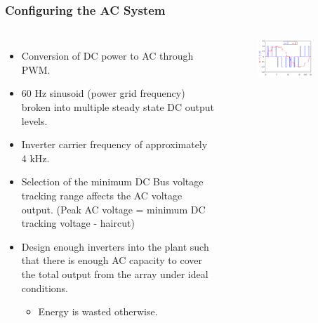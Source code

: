 \documentclass[aspectratio=169]{beamer}
\begin{document}
\begin{frame}
  \frametitle{Configuring the AC System}
  \begin{columns}[t]
    \begin{itemize}
    \item Conversion of DC power to AC through PWM.
    \item 60 Hz sinusoid (power grid frequency) broken into multiple
      steady state DC output levels.
    \item Inverter carrier frequency of approximately 4 kHz.
    \item Selection of the minimum DC Bus voltage tracking range
      affects the AC voltage output. (Peak AC voltage = minimum DC
      tracking voltage - haircut)
    \item Design enough inverters into the plant such that there is
      enough AC capacity to cover the total output from the array
      under ideal conditions.
      \begin{itemize}
      \item Energy is wasted otherwise.
      \end{itemize}
    \end{itemize}

    \begin{figure}
      \includegraphics[width=0.75\textwidth]{PWM.png}
    \end{figure}    
  \end{columns}
\end{frame}
\end{document}
